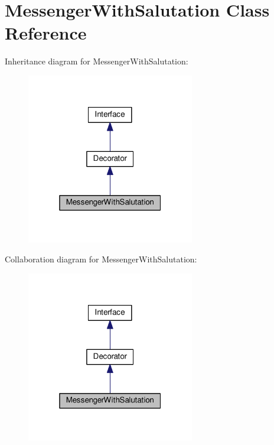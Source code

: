\hypertarget{classMessengerWithSalutation}{}\section{Messenger\+With\+Salutation Class Reference}
\label{classMessengerWithSalutation}


Inheritance diagram for Messenger\+With\+Salutation\+:
\nopagebreak
\begin{figure}[H]
\begin{center}
\leavevmode
\includegraphics[width=208pt]{classMessengerWithSalutation__inherit__graph}
\end{center}
\end{figure}


Collaboration diagram for Messenger\+With\+Salutation\+:
\nopagebreak
\begin{figure}[H]
\begin{center}
\leavevmode
\includegraphics[width=208pt]{classMessengerWithSalutation__coll__graph}
\end{center}
\end{figure}

